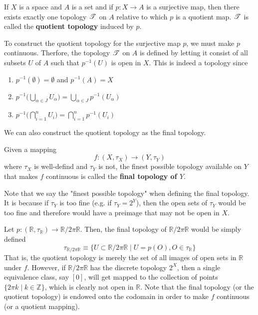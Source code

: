     \begin{definition}
      If $X$ is a space and $A$ is a set and if $p: X \rightarrow A$ is a surjective map, then there exists exactly one topology $\T$ on $A$ relative to which $p$ is a quotient map. $\T$ is called the \textbf{quotient topology} induced by $p$. 
    \end{definition}

    To construct the quotient topology for the surjective map $p$, we must make $p$ continuous. Therfore, the topology $\T$ on $A$ is defined by letting it consist of all subsets $U$ of $A$ such that $p^{-1}(U)$ is open in $X$. This is indeed a topology since
    \begin{enumerate}
      \item $p^{-1} (\emptyset) = \emptyset$ and $p^{-1}(A) = X$
      \item $p^{-1} \Big( \bigcup_{\alpha \in J} U_\alpha \Big) = \bigcup_{\alpha \in J} p^{-1} (U_\alpha)$
      \item $p^{-1} \Big( \bigcap_{i=1}^n U_i \Big) = \bigcap_{i=1}^n p^{-1} (U_i)$
    \end{enumerate}

    We can also construct the quotient topology as the final topology. 

    \begin{definition}
      Given a mapping 
      \begin{equation}
        f: (X, \tau_X) \rightarrow (Y, \tau_Y)
      \end{equation}
      where $\tau_X$ is well-defind and $\tau_Y$ is not, the finest possible topology available on $Y$ that makes $f$ continuous is called the \textbf{final topology of $Y$}. 
    \end{definition}

    Note that we say the "finest possible topology" when defining the final topology. It is because if $\tau_Y$ is too fine (e.g. if $\tau_Y = 2^Y$), then the open sets of $\tau_Y$ would be too fine and therefore would have a preimage that may not be open in $X$. 

    \begin{example}
      Let $p: (\mathbb{R}, \tau_\mathbb{R}) \rightarrow \mathbb{R} / 2 \pi \mathbb{R}$. Then, the final topology of $\mathbb{R} / 2 \pi \mathbb{R}$ would be simply defined 
      \begin{equation}
        \tau_{\mathbb{R} / 2 \pi \mathbb{R}} \equiv \{U \subset \mathbb{R} / 2\pi \mathbb{R} \; | \; U = p(O), O \in \tau_\mathbb{R}\}
      \end{equation}
      That is, the quotient topology is merely the set of all images of open sets in $\mathbb{R}$ under $f$. However, if $\mathbb{R} / 2 \pi \mathbb{R}$ has the discrete topology $2^X$, then a single equivalence class, say $[0]$, will get mapped to the collection of points $\{2 \pi k \mid k \in \mathbb{Z}\}$, which is clearly not open in $\mathbb{R}$. Note that the final topology (or the quotient topology) is endowed onto the codomain in order to make $f$ continuous (or a quotient mapping). 
    \end{example}

